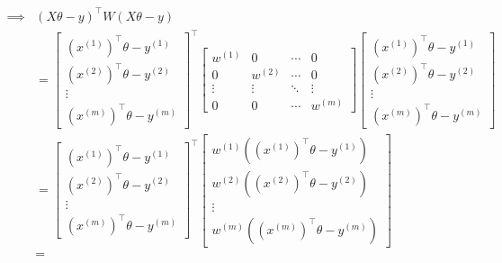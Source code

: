 \begin{align*}
    \implies
     &
    {(X \theta - y)}^\top W (X \theta - y)
    \\ & =
    \begin{bmatrix}
        {\left(x^{(1)}\right)}^\top \theta - y^{(1)} \\
        {\left(x^{(2)}\right)}^\top \theta - y^{(2)} \\
        \vdots                                       \\
        {\left(x^{(m)}\right)}^\top \theta - y^{(m)}
    \end{bmatrix}^\top
    \begin{bmatrix}
        w^{(1)} & 0       & \cdots & 0       \\
        0       & w^{(2)} & \cdots & 0       \\
        \vdots  & \vdots  & \ddots & \vdots  \\
        0       & 0       & \cdots & w^{(m)}
    \end{bmatrix}
    \begin{bmatrix}
        {\left(x^{(1)}\right)}^\top \theta - y^{(1)} \\
        {\left(x^{(2)}\right)}^\top \theta - y^{(2)} \\
        \vdots                                       \\
        {\left(x^{(m)}\right)}^\top \theta - y^{(m)}
    \end{bmatrix}
    \\ & =
    \begin{bmatrix}
        {\left(x^{(1)}\right)}^\top \theta - y^{(1)} \\
        {\left(x^{(2)}\right)}^\top \theta - y^{(2)} \\
        \vdots                                       \\
        {\left(x^{(m)}\right)}^\top \theta - y^{(m)}
    \end{bmatrix}^\top
    \begin{bmatrix}
        w^{(1)}{\left({\left(x^{(1)}\right)}^\top \theta - y^{(1)}\right)} \\
        w^{(2)}{\left({\left(x^{(2)}\right)}^\top \theta - y^{(2)}\right)} \\
        \vdots                                                             \\
        w^{(m)}{\left({\left(x^{(m)}\right)}^\top \theta - y^{(m)}\right)}
    \end{bmatrix}
    \\ & =

\end{align*}
